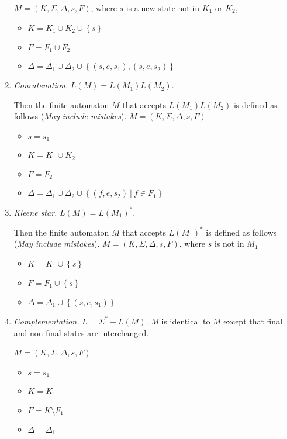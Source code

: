 \begin{multicols}{2}
\begin{enumerate}[label=(\alph*)]
  $M = (K, \Sigma, \Delta, s, F)$, where $s$ is a new state not in $K_1$ or $K_2$,
  \begin{itemize}
    \item $K = K_1 \cup K_2 \cup \left\{ s \right\}$
    \item $F = F_1 \cup F_2$
    \item $\Delta = \Delta_1 \cup \Delta_2 \cup \left\{ (s,e,s_1),(s,e,s_2) \right\}$
  \end{itemize}

  \item \textit{Concatenation.}
  $L(M) = L(M_1) L(M_2)$.

  Then the finite automaton $M$ that accepts $L(M_1) L(M_2)$ is defined as follows (\textit{May include mistakes}). $M = (K, \Sigma, \Delta, s, F)$
  \begin{itemize}
    \item $s = s_1$
    \item $K = K_1 \cup K_2$
    \item $F = F_2$
    \item $\Delta = \Delta_1 \cup \Delta_2 \cup \left\{ (f,e,s_2)\ |\ f \in F_1 \right\}$
  \end{itemize}

  \item \textit{Kleene star.}
  $L(M) = L(M_1)^*$. 

  Then the finite automaton $M$ that accepts $L(M_1)^*$ is defined as follows (\textit{May include mistakes}). $M = (K, \Sigma, \Delta, s, F)$, where $s$ is not in $M_1$
  \begin{itemize}
    \item $K = K_1 \cup \left\{ s \right\}$
    \item $F = F_1 \cup \left\{ s \right\}$
    \item $\Delta = \Delta_1 \cup \left\{ (s,e,s_1) \right\}$
  \end{itemize}

  \item \textit{Complementation.}
  $\overline{L} = \Sigma^* - L(M)$. $\overline{M}$ is identical to $M$ except that final and non final states are interchanged.

  $M = (K, \Sigma, \Delta, s, F)$.
  \begin{itemize}
    \item $s = s_1$
    \item $K = K_1$
    \item $F = K \setminus F_1$
    \item $\Delta = \Delta_1$
  \end{itemize}


\end{enumerate}
\end{multicols}
